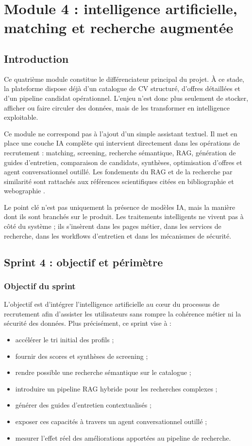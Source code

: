 \chapter{Module 4 : intelligence artificielle, matching et recherche augmentée}

\section*{Introduction}
Ce quatrième module constitue le différenciateur principal du projet. À ce stade, la plateforme dispose déjà d'un catalogue de CV structuré, d'offres détaillées et d'un pipeline candidat opérationnel. L'enjeu n'est donc plus seulement de stocker, afficher ou faire circuler des données, mais de les transformer en intelligence exploitable.

Ce module ne correspond pas à l'ajout d'un simple assistant textuel. Il met en place une couche IA complète qui intervient directement dans les opérations de recrutement : matching, screening, recherche sémantique, RAG, génération de guides d'entretien, comparaison de candidats, synthèses, optimisation d'offres et agent conversationnel outillé. Les fondements du RAG et de la recherche par similarité sont rattachés aux références scientifiques citées en bibliographie et webographie .

Le point clé n'est pas uniquement la présence de modèles IA, mais la manière dont ils sont branchés sur le produit. Les traitements intelligents ne vivent pas à côté du système ; ils s'insèrent dans les pages métier, dans les services de recherche, dans les workflows d'entretien et dans les mécanismes de sécurité.

\section{Sprint 4 : objectif et périmètre}

\subsection{Objectif du sprint}
L'objectif est d'intégrer l'intelligence artificielle au c\oe{}ur du processus de recrutement afin d'assister les utilisateurs sans rompre la cohérence métier ni la sécurité des données. Plus précisément, ce sprint vise à :
\begin{itemize}
  \item accélérer le tri initial des profils ;
  \item fournir des scores et synthèses de screening ;
  \item rendre possible une recherche sémantique sur le catalogue ;
  \item introduire un pipeline RAG hybride pour les recherches complexes ;
  \item générer des guides d'entretien contextualisés ;
  \item exposer ces capacités à travers un agent conversationnel outillé ;
  \item mesurer l'effet réel des améliorations apportées au pipeline de recherche.
\end{itemize}

